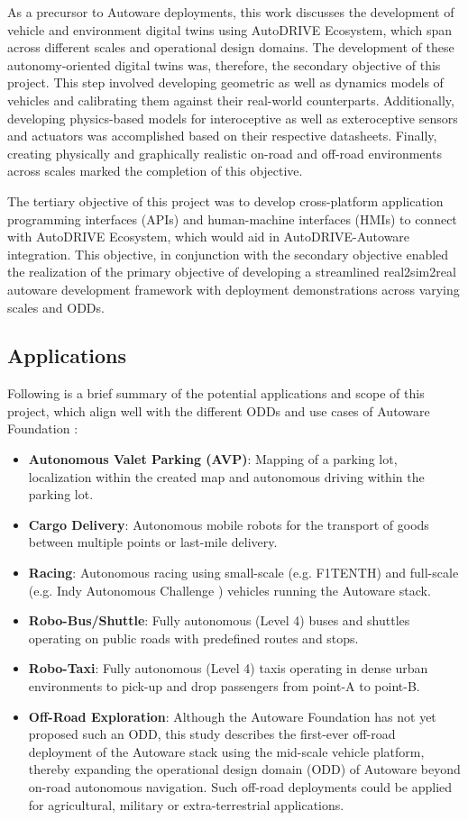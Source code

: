 As a precursor to Autoware deployments, this work discusses the development of vehicle and environment digital twins using AutoDRIVE Ecosystem, which span across different scales and operational design domains. The development of these autonomy-oriented digital twins was, therefore, the secondary objective of this project. This step involved developing geometric as well as dynamics models of vehicles and calibrating them against their real-world counterparts. Additionally, developing physics-based models for interoceptive as well as exteroceptive sensors and actuators was accomplished based on their respective datasheets. Finally, creating physically and graphically realistic on-road and off-road environments across scales marked the completion of this objective.

The tertiary objective of this project was to develop cross-platform application programming interfaces (APIs) and human-machine interfaces (HMIs) to connect with AutoDRIVE Ecosystem, which would aid in AutoDRIVE-Autoware integration. This objective, in conjunction with the secondary objective enabled the realization of the primary objective of developing a streamlined real2sim2real autoware development framework with deployment demonstrations across varying scales and ODDs.

\hypertarget{Applications}{%
\subsection{Applications}\label{Applications}}

Following is a brief summary of the potential applications and scope of this project, which align well with the different ODDs and use cases of Autoware Foundation \cite{AutowareOverview}:

\begin{itemize}
    \item \textbf{Autonomous Valet Parking (AVP)}: Mapping of a parking lot, localization within the created map and autonomous driving within the parking lot.
    \item \textbf{Cargo Delivery}: Autonomous mobile robots for the transport of goods between multiple points or last-mile delivery.
    \item \textbf{Racing}: Autonomous racing using small-scale (e.g. F1TENTH) and full-scale (e.g. Indy Autonomous Challenge \cite{IAC}) vehicles running the Autoware stack.
    \item \textbf{Robo-Bus/Shuttle}: Fully autonomous (Level 4) buses and shuttles operating on public roads with predefined routes and stops.
    \item \textbf{Robo-Taxi}: Fully autonomous (Level 4) taxis operating in dense urban environments to pick-up and drop passengers from point-A to point-B.
    \item \textbf{Off-Road Exploration}: Although the Autoware Foundation has not yet proposed such an ODD, this study describes the first-ever off-road deployment of the Autoware stack using the mid-scale vehicle platform, thereby expanding the operational design domain (ODD) of Autoware beyond on-road autonomous navigation. Such off-road deployments could be applied for agricultural, military or extra-terrestrial applications.
\end{itemize}
